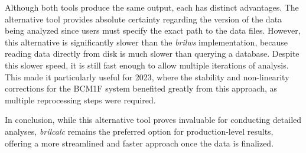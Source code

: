 Although both tools produce the same output, each has distinct advantages. The alternative tool provides absolute certainty regarding the version of the data being analyzed since users must specify the exact path to the data files. However, this alternative is significantly slower than the \textit{brilws} implementation, because reading data directly from disk is much slower than querying a database. Despite this slower speed, it is still fast enough to allow multiple iterations of analysis.  This made it particularly useful for 2023, where the stability and non-linearity corrections for the BCM1F system benefited greatly from this approach, as multiple reprocessing steps were required.

In conclusion, while this alternative tool proves invaluable for conducting detailed analyses, \textit{brilcalc} remains the preferred option for production-level results, offering a more streamlined and faster approach once the data is finalized.
